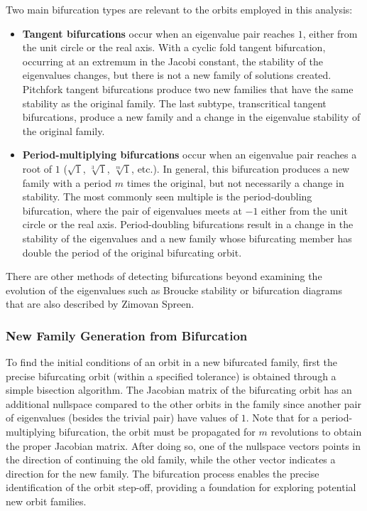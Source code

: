 Two main bifurcation types are relevant to the orbits employed in this analysis:
\begin{itemize}
    \item \textbf{Tangent bifurcations} occur when an eigenvalue pair reaches $1$, either from the
    unit circle or the real axis. With a cyclic fold tangent bifurcation, occurring at an extremum
    in the Jacobi constant, the stability of the eigenvalues changes, but there is not a new family
    of solutions created. Pitchfork tangent bifurcations produce two new families that have the
    same stability as the original family. The last subtype, transcritical tangent bifurcations,
    produce a new family and a change in the eigenvalue stability of the original family.
    \item \textbf{Period-multiplying bifurcations} occur when an eigenvalue pair reaches a root of
    $1$ ($\sqrt{1}$, $\sqrt[3]{1}$, $\sqrt[m]{1}$, etc.). In general, this bifurcation produces a
    new family with a period $m$ times the original, but not necessarily a change in stability. The
    most commonly seen multiple is the period-doubling bifurcation, where the pair of eigenvalues
    meets at $-1$ either from the unit circle or the real axis. Period-doubling bifurcations
    result in a change in the stability of the eigenvalues and a new family whose bifurcating
    member has double the period of the original bifurcating orbit.
\end{itemize}
There are other methods of detecting bifurcations beyond examining the evolution of the eigenvalues
such as Broucke stability or bifurcation diagrams that are also described by Zimovan
Spreen\cite{ZimovanSpreen:2021}.

\subsubsection{New Family Generation from Bifurcation}
To find the initial conditions of an orbit in a new bifurcated family, first the precise
bifurcating orbit (within a specified tolerance) is obtained through a simple bisection algorithm.
The Jacobian matrix of the bifurcating orbit has an additional nullspace compared to the other
orbits in the family since another pair of eigenvalues (besides the trivial pair) have values of
$1$. Note that for a period-multiplying bifurcation, the orbit must be propagated for $m$
revolutions to obtain the proper Jacobian matrix. After doing so, one of the nullspace vectors
points in the direction of continuing the old family, while the other vector indicates a direction
for the new family. The bifurcation process enables the precise identification of the orbit
step-off, providing a foundation for exploring potential new orbit families.

